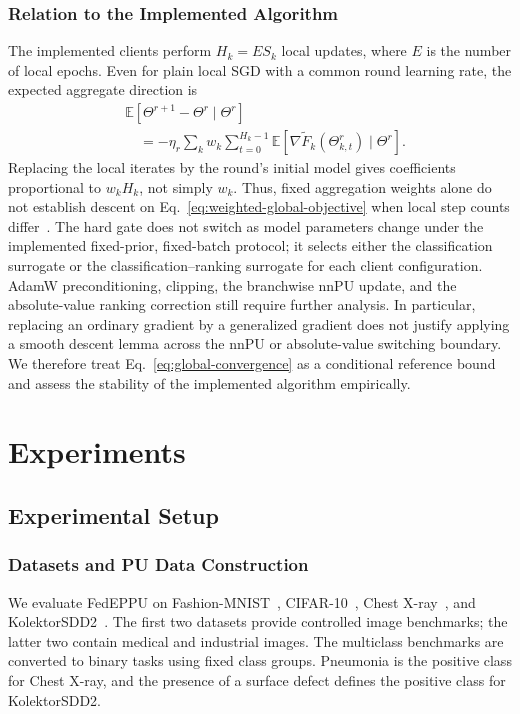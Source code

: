 \documentclass[lettersize,journal]{IEEEtran}
\begin{document}
\subsubsection{Relation to the Implemented Algorithm}

The implemented clients perform $H_k=ES_k$ local updates, where $E$ is the number of local epochs. Even for plain local SGD with a common round learning rate, the expected aggregate direction is
\begin{equation}
\begin{aligned}
&\mathbb E[\Theta^{r+1}-\Theta^r\mid\Theta^r]\\
&\quad=-\eta_r\sum_k w_k\sum_{t=0}^{H_k-1}
\mathbb E[\nabla\widetilde F_k(\Theta_{k,t}^r)\mid\Theta^r].
\end{aligned}
\label{eq:local-step-direction}
\end{equation}
Replacing the local iterates by the round's initial model gives coefficients proportional to $w_kH_k$, not simply $w_k$. Thus, fixed aggregation weights alone do not establish descent on Eq.~\eqref{eq:weighted-global-objective} when local step counts differ~\cite{ref_fednova}. The hard gate does not switch as model parameters change under the implemented fixed-prior, fixed-batch protocol; it selects either the classification surrogate or the classification--ranking surrogate for each client configuration. AdamW preconditioning, clipping, the branchwise nnPU update, and the absolute-value ranking correction still require further analysis. In particular, replacing an ordinary gradient by a generalized gradient does not justify applying a smooth descent lemma across the nnPU or absolute-value switching boundary. We therefore treat Eq.~\eqref{eq:global-convergence} as a conditional reference bound and assess the stability of the implemented algorithm empirically.

\section{Experiments}
\label{sec:experiments}

\subsection{Experimental Setup}

\subsubsection{Datasets and PU Data Construction}
We evaluate FedEPPU on Fashion-MNIST~\cite{ref_fashion}, CIFAR-10~\cite{ref_cifar}, Chest X-ray~\cite{ref_chest}, and KolektorSDD2~\cite{ref_kolektor}. The first two datasets provide controlled image benchmarks; the latter two contain medical and industrial images. The multiclass benchmarks are converted to binary tasks using fixed class groups. Pneumonia is the positive class for Chest X-ray, and the presence of a surface defect defines the positive class for KolektorSDD2.
\end{document}
